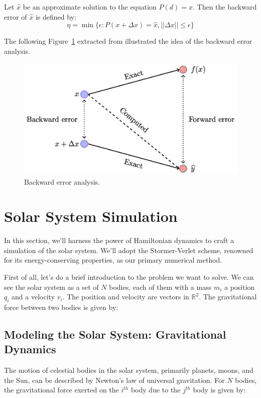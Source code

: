 \documentclass{report}
\begin{document}
\begin{definition}
	Let \(\hat{x}\) be an approximate solution to the equation \(P(d) = x\). Then the backward error of \(\hat{x}\) is defined by:
	\[
		\eta = \min \{ \epsilon : P(x + \Delta x) = \hat{x}, ||\Delta x|| \leq \epsilon \}
	\]
\end{definition}

The following Figure~\ref{fig:backwarderror} extracted from \cite{higham2020backwarderror} illustrated the idea of the backward error analysis.

\begin{figure}[H]
	\centering
	\includegraphics[width=0.5\linewidth]{./Figures/Sympletic/graphic.jpg}
	\caption{Backward error analysis.}
	\label{fig:backwarderror}
\end{figure}








\section{Solar System Simulation}
\label{sec:solar_system_simulation}

In this section, we'll harness the power of Hamiltonian dynamics to craft a simulation of the solar system. We'll adopt the Stormer-Verlet scheme, renowned for its energy-conserving properties, as our primary numerical method.

First of all, let's do a brief introduction to the problem we want to solve. We can see the solar system as a set of \(N\) bodies, each of them with a mass \(m_i\) a position \(q_i\) and a velocity \(v_i\). The position and velocity are vectors in \(\mathbb{R}^2\). The gravitational force between two bodies is given by:

\subsection{Modeling the Solar System: Gravitational Dynamics}
\label{sec:modeling_solar_system}

The motion of celestial bodies in the solar system, primarily planets, moons, and the Sun, can be described by Newton's law of universal gravitation. For \(N\) bodies, the gravitational force exerted on the \(i^{th}\) body due to the \(j^{th}\) body is given by:
\end{document}
